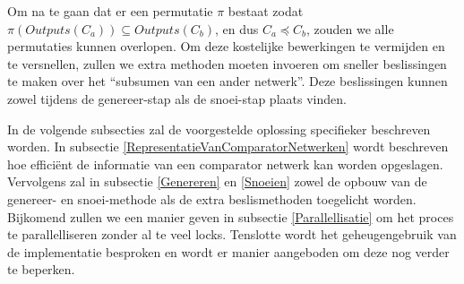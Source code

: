 \documentclass{article}
\begin{document}
Om na te gaan dat er een permutatie $\pi$ bestaat zodat ${\pi\left(Outputs\left(C_{a}\right)\right) \subseteq Outputs\left(C_{b}\right)}$, en dus $C_a \preceq C_{b}$, zouden we alle permutaties kunnen overlopen.
Om deze kostelijke bewerkingen te vermijden en te versnellen, zullen we extra methoden moeten invoeren om sneller beslissingen te maken over het ``subsumen van een ander netwerk''. 
Deze beslissingen kunnen zowel tijdens de genereer-stap als de snoei-stap plaats vinden.

In de volgende subsecties zal de voorgestelde oplossing specifieker beschreven worden.
In subsectie \ref{RepresentatieVanComparatorNetwerken} wordt beschreven hoe effici\"ent de informatie van een comparator netwerk kan worden opgeslagen.
Vervolgens zal in subsectie \ref{Genereren} en \ref{Snoeien} zowel de opbouw van de genereer- en snoei-methode als de extra beslismethoden toegelicht worden.
Bijkomend zullen we een manier geven in subsectie \ref{Parallellisatie} om het proces te parallelliseren zonder al te veel locks.
Tenslotte wordt het geheugengebruik van de implementatie besproken en wordt er manier aangeboden om deze nog verder te beperken.
\end{document}
